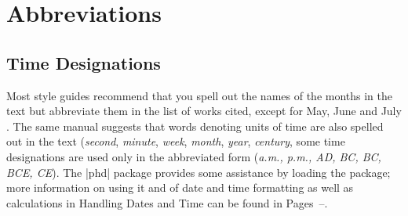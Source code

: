 \section{Abbreviations}

\subsection{Time Designations}

Most style guides recommend that you spell out the names of the months in the text but abbreviate them in the list  of works cited, except for May, June and July \citep{MLA}. The same manual suggests that words denoting units of time are also spelled out in the text (\textit{second}, \textit{minute}, \textit{week}, \textit{month}, \textit{year}, \textit{century}, some time designations are used only in the abbreviated form (\textit{a.m., p.m., AD, BC, BC, BCE, CE}). The |phd| package provides some assistance by loading the  package; more information on using it and of date and time formatting as well as calculations in Handling Dates and Time can be found in Pages~\pageref{ch:dates}--\pageref{datesend}.
\medskip

